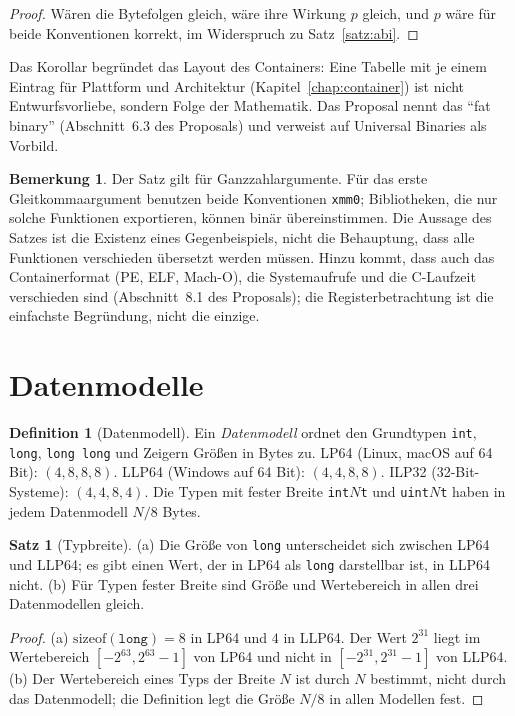 \documentclass[a4paper,12pt,twoside]{report}
\DeclareRobustCommand{\_}{\ifmmode\mbox{\textunderscore}\else\textunderscore\allowbreak{}\fi}
\theoremstyle{definition}
\newtheorem{definition}{Definition}[chapter]
\newtheorem{satz}{Satz}[chapter]
\newtheorem{bemerkung}{Bemerkung}[chapter]
\begin{document}
\begin{proof}
	Wären die Bytefolgen gleich, wäre ihre Wirkung $p$ gleich, und $p$ wäre für beide Konventionen korrekt, im Widerspruch zu Satz~\ref{satz:abi}.
\end{proof}

Das Korollar begründet das Layout des Containers: Eine Tabelle mit je einem Eintrag für Plattform und Architektur (Kapitel~\ref{chap:container}) ist nicht Entwurfsvorliebe, sondern Folge der Mathematik. Das Proposal nennt das ``fat binary'' (Abschnitt~6.3 des Proposals) und verweist auf Universal Binaries als Vorbild.

\begin{bemerkung}
	Der Satz gilt für Ganzzahlargumente. Für das erste Gleitkommaargument benutzen beide Konventionen \texttt{xmm0}; Bibliotheken, die nur solche Funktionen exportieren, können binär übereinstimmen. Die Aussage des Satzes ist die Existenz eines Gegenbeispiels, nicht die Behauptung, dass alle Funktionen verschieden übersetzt werden müssen. Hinzu kommt, dass auch das Containerformat (PE, ELF, Mach-O), die Systemaufrufe und die C-Laufzeit verschieden sind (Abschnitt~8.1 des Proposals); die Registerbetrachtung ist die einfachste Begründung, nicht die einzige.
\end{bemerkung}

\section{Datenmodelle}

\begin{definition}[Datenmodell]
	\label{def:daten}
	Ein \emph{Datenmodell} ordnet den Grundtypen \texttt{int}, \texttt{long}, \texttt{long long} und Zeigern Größen in Bytes zu. LP64 (Linux, macOS auf 64 Bit): $(4,8,8,8)$. LLP64 (Windows auf 64 Bit): $(4,4,8,8)$. ILP32 (32-Bit-Systeme): $(4,4,8,4)$. Die Typen mit fester Breite \texttt{int$N$\_t} und \texttt{uint$N$\_t} haben in jedem Datenmodell $N/8$ Bytes.
\end{definition}

\begin{satz}[Typbreite]
	\label{satz:typbreite}
	(a) Die Größe von \texttt{long} unterscheidet sich zwischen LP64 und LLP64; es gibt einen Wert, der in LP64 als \texttt{long} darstellbar ist, in LLP64 nicht. (b) Für Typen fester Breite sind Größe und Wertebereich in allen drei Datenmodellen gleich.
\end{satz}

\begin{proof}
	(a) $\mathrm{sizeof}(\mathtt{long})=8$ in LP64 und $4$ in LLP64. Der Wert $2^{31}$ liegt im Wertebereich $[-2^{63},2^{63}-1]$ von LP64 und nicht in $[-2^{31},2^{31}-1]$ von LLP64. (b) Der Wertebereich eines Typs der Breite $N$ ist durch $N$ bestimmt, nicht durch das Datenmodell; die Definition legt die Größe $N/8$ in allen Modellen fest.
\end{proof}
\end{document}
